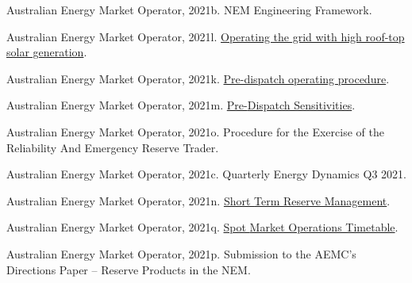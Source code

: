 \documentclass[12pt,a4paper,]{report}
\newlength{\cslhangindent}
\newenvironment{CSLReferences}[2] %
 {%
  \setlength{\parindent}{0pt}
  \ifodd #1 \everypar{\setlength{\hangindent}{\cslhangindent}}\ignorespaces\fi
  \ifnum #2 > 0
  \setlength{\parskip}{#2\baselineskip}
  \fi
 }%
 {}
\begin{document}
\begin{CSLReferences}{1}{0}
\leavevmode{}%
Australian Energy Market Operator, 2021b. {NEM Engineering Framework}.

\leavevmode{}%
Australian Energy Market Operator, 2021l.
\href{https://www.aemo.com.au/-/media/files/electricity/nem/security_and_reliability/power_system_ops/consumer-fact-sheet.pdf}{Operating
the grid with high roof-top solar generation}.

\leavevmode{}%
Australian Energy Market Operator, 2021k.
\href{https://www.aemo.com.au/-/media/files/electricity/nem/security_and_reliability/power_system_ops/procedures/so_op_3704-predispatch.pdf?la=en}{Pre-dispatch
operating procedure}.

\leavevmode{}%
Australian Energy Market Operator, 2021m.
\href{https://www.aemo.com.au/-/media/files/electricity/nem/security_and_reliability/dispatch/policy_and_process/pre-dispatch-sensitivities.pdf}{Pre-{Dispatch
Sensitivities}}.

\leavevmode{}%
Australian Energy Market Operator, 2021o. Procedure for the {Exercise}
of the {Reliability And Emergency Reserve Trader}.

\leavevmode{}%
Australian Energy Market Operator, 2021c. Quarterly {Energy Dynamics Q3}
2021.

\leavevmode{}%
Australian Energy Market Operator, 2021n.
\href{https://aemo.com.au/-/media/files/electricity/nem/security_and_reliability/power_system_ops/procedures/so_op_3703-short-term-reserve-management.pdf?la=en}{Short
{Term Reserve Management}}.

\leavevmode{}%
Australian Energy Market Operator, 2021q.
\href{https://www.aemo.com.au/-/media/Files/Electricity/NEM/Security_and_Reliability/Dispatch/Spot-Market-Operations-Timetable.pdf}{Spot
{Market Operations Timetable}}.

\leavevmode{}%
Australian Energy Market Operator, 2021p. Submission to the {AEMC}'s
{Directions Paper} -- {Reserve Products} in the {NEM}.


\end{CSLReferences}
\end{document}
